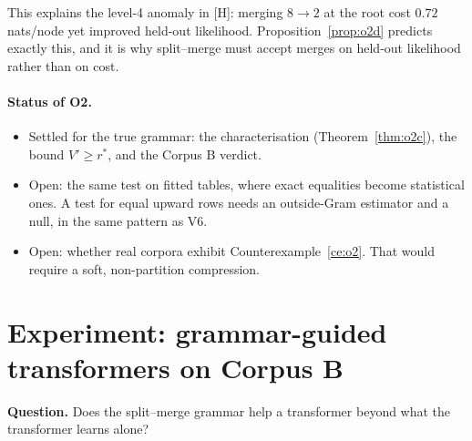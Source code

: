 \documentclass[11pt]{article}
\theoremstyle{definition}
\theoremstyle{remark}
\newcommand{\src}[1]{\textsf{\small[#1]}}
\begin{document}
\noindent This explains the level-4 anomaly in \src{H}: merging $8\to2$ at the root cost $0.72$ nats/node yet improved held-out likelihood. Proposition~\ref{prop:o2d} predicts exactly this, and it is why split--merge must accept merges on held-out likelihood rather than on cost.

\paragraph{Status of O2.}
\begin{itemize}
  \item Settled for the true grammar: the characterisation (Theorem~\ref{thm:o2c}), the bound $V'\ge r^*$, and the Corpus B verdict.
  \item Open: the same test on fitted tables, where exact equalities become statistical ones. A test for equal upward rows needs an outside-Gram estimator and a null, in the same pattern as V6.
  \item Open: whether real corpora exhibit Counterexample~\ref{ce:o2}. That would require a soft, non-partition compression.
\end{itemize}

\section{Experiment: grammar-guided transformers on Corpus B}\label{sec:exp1}
\textbf{Question.} Does the split--merge grammar help a transformer beyond what the transformer learns alone?
\end{document}
